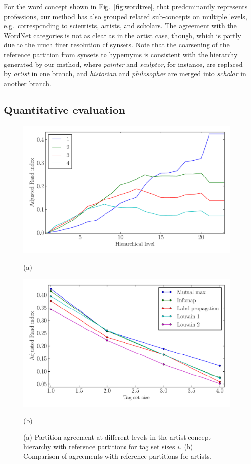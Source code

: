 \documentclass[conference]{IEEEtran}
\newcommand{\fig}[1]{Fig.\ \ref{#1}}
\begin{document}
For the word concept shown in \fig{fig:wordtree}, that predominantly represents professions, our method has also grouped related sub-concepts
on multiple levels, e.g.\ corresponding to scientists, artists, and scholars. The agreement with the WordNet categories is not
as clear as in the artist case, though, which is partly due to the much finer resolution of synsets. Note that the coarsening of the reference partition
from synsets to hypernyms is consistent with the hierarchy generated by our method, where \emph{painter} and \emph{sculptor},
for instance, are replaced by \emph{artist} in one branch, and \emph{historian} and \emph{philosopher} are merged into \emph{scholar} in another branch.

\subsection{Quantitative evaluation}
\label{sec:quantitative}

\begin{figure}
\begin{center}
\includegraphics[width=0.9\columnwidth]{figures/1465824758-all-tags-1.pdf}
\centerline{\footnotesize{(a)}}
\includegraphics[width=0.9\columnwidth]{figures/1465824758-all-tags-2.pdf}
\centerline{\footnotesize{(b)}}
\end{center}
\caption{(a) Partition agreement at different levels in the artist concept hierarchy with reference partitions for tag set sizes $i$.
(b) Comparison of agreements with reference partitions for artists.}
\label{fig:artistplots}
\end{figure}
\end{document}
